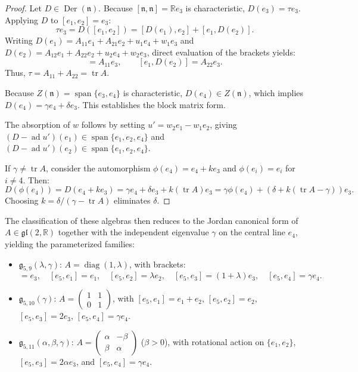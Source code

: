\documentclass[11pt,a4paper]{article}
\theoremstyle{definition}
\theoremstyle{remark}
\newcommand{\R}{\mathbb{R}}
\newcommand{\g}{\mathfrak{g}}
\newcommand{\n}{\mathfrak{n}}
\newcommand{\ad}{\operatorname{ad}}
\newcommand{\Der}{\operatorname{Der}}
\newcommand{\tr}{\operatorname{tr}}
\newcommand{\diag}{\operatorname{diag}}
\newcommand{\spanop}{\operatorname{span}}
\begin{document}
\begin{proof}
Let $D \in \Der(\n)$. Because $[\n, \n] = \R e_3$ is characteristic, $D(e_3) = \tau e_3$. Applying $D$ to $[e_1, e_2] = e_3$:
\begin{equation}
    \tau e_3 = D([e_1, e_2]) = [D(e_1), e_2] + [e_1, D(e_2)].
\end{equation}
Writing $D(e_1) = A_{11}e_1 + A_{21}e_2 + u_1 e_4 + w_1 e_3$ and $D(e_2) = A_{12}e_1 + A_{22}e_2 + u_2 e_4 + w_2 e_3$, direct evaluation of the brackets yields:
\begin{equation}
    [D(e_1), e_2] = A_{11}e_3, \qquad [e_1, D(e_2)] = A_{22}e_3.
\end{equation}
Thus, $\tau = A_{11} + A_{22} = \tr A$. 

Because $Z(\n) = \spanop\{e_3, e_4\}$ is characteristic, $D(e_4) \in Z(\n)$, which implies $D(e_4) = \gamma e_4 + \delta e_3$. This establishes the block matrix form. 

The absorption of $w$ follows by setting $u' = w_2 e_1 - w_1 e_2$, giving $(D - \ad u')(e_1) \in \spanop\{e_1, e_2, e_4\}$ and $(D - \ad u')(e_2) \in \spanop\{e_1, e_2, e_4\}$. 

If $\gamma \neq \tr A$, consider the automorphism $\phi(e_4) = e_4 + k e_3$ and $\phi(e_i) = e_i$ for $i \neq 4$. Then:
\begin{equation}
    D(\phi(e_4)) = D(e_4 + k e_3) = \gamma e_4 + \delta e_3 + k(\tr A)e_3 = \gamma \phi(e_4) + (\delta + k(\tr A - \gamma))e_3.
\end{equation}
Choosing $k = \delta / (\gamma - \tr A)$ eliminates $\delta$.
\end{proof}

The classification of these algebras then reduces to the Jordan canonical form of $A \in \mathfrak{gl}(2,\R)$ together with the independent eigenvalue $\gamma$ on the central line $e_4$, yielding the parameterized families:
\begin{itemize}
    \item $\g_{5,9}(\lambda, \gamma)$: $A = \diag(1, \lambda)$, with brackets:
    \begin{equation}
        [e_1, e_2] = e_3, \quad [e_5, e_1] = e_1, \quad [e_5, e_2] = \lambda e_2, \quad [e_5, e_3] = (1+\lambda)e_3, \quad [e_5, e_4] = \gamma e_4.
    \end{equation}
    \item $\g_{5,10}(\gamma)$: $A = \begin{pmatrix} 1 & 1 \\ 0 & 1 \end{pmatrix}$, with $[e_5, e_1] = e_1 + e_2$, $[e_5, e_2] = e_2$, $[e_5, e_3] = 2e_3$, $[e_5, e_4] = \gamma e_4$.
    \item $\g_{5,11}(\alpha, \beta, \gamma)$: $A = \begin{pmatrix} \alpha & -\beta \\ \beta & \alpha \end{pmatrix}$ ($\beta > 0$), with rotational action on $\{e_1, e_2\}$, $[e_5, e_3] = 2\alpha e_3$, and $[e_5, e_4] = \gamma e_4$.
\end{itemize}
\end{document}
